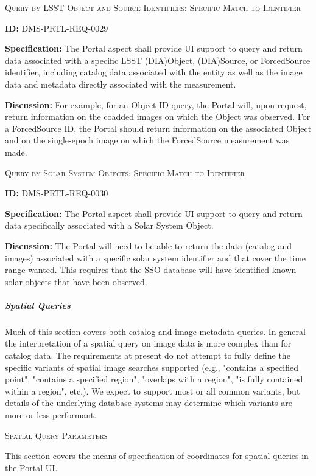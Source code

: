\documentclass[SE,toc,lsstdraft]{lsstdoc}
\begin{document}
\textsc{Query by LSST Object and Source Identifiers: Specific Match to Identifier}

\label{DMS-PRTL-REQ-0029}
\textbf{ID:} DMS-PRTL-REQ-0029

\textbf{Specification:}
The Portal aspect shall provide UI support to query and return data associated with a specific LSST (DIA)Object, (DIA)Source, or ForcedSource identifier, including catalog data associated with the entity as well as the image data and metadata directly associated with the measurement.

\textbf{Discussion:}
For example, for an Object ID query, the Portal will, upon request, return information on the coadded images on which the Object was observed.  For a ForcedSource ID, the Portal should return information on the associated Object and on the single-epoch image on which the ForcedSource measurement was made.

\textsc{Query by Solar System Objects: Specific Match to Identifier}

\label{DMS-PRTL-REQ-0030}
\textbf{ID:} DMS-PRTL-REQ-0030

\textbf{Specification:}
The Portal aspect shall provide UI support to query and return data specifically associated with a Solar System Object.

\textbf{Discussion:}
The Portal will need to be able to return the data (catalog and images) associated with a specific solar system identifier and that cover the time range wanted.  This requires that the SSO database will have identified known solar objects that have been observed.

\subparagraph{Spatial Queries}\hfill  %

Much of this section covers both catalog and image metadata queries.  In general the interpretation of a spatial query on image data is more complex than for catalog data.  The requirements at present do not attempt to fully define the specific variants of spatial image searches supported (e.g., "contains a specified point", "contains a specified region", "overlaps with a region", "is fully contained within a region", etc.).  We expect to support most or all common variants, but details of the underlying database systems may determine which variants are more or less performant.

\textsc{Spatial Query Parameters}

This section covers the means of specification of coordinates for spatial queries in the Portal UI.
\end{document}
